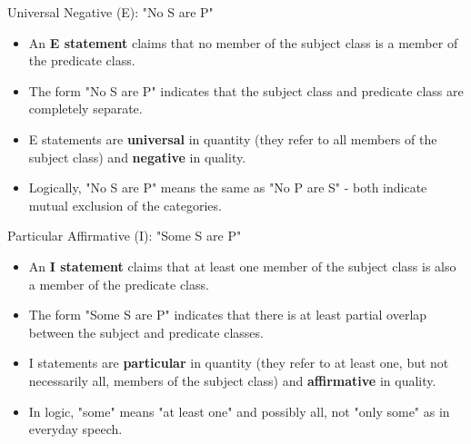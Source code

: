 \documentclass{beamer}
\begin{document}
	\begin{frame}{Universal Negative (E): "No S are P"}
		\begin{itemize}
			\item An \textbf{E statement} claims that no member of the subject class is a member of the predicate class.
			\item The form "No S are P" indicates that the subject class and predicate class are completely separate.
			\item E statements are \textbf{universal} in quantity (they refer to all members of the subject class) and \textbf{negative} in quality.
			\item Logically, "No S are P" means the same as "No P are S" - both indicate mutual exclusion of the categories.
		\end{itemize}
		
		\begin{center}
		\end{center}
	\end{frame}
	
	\begin{frame}{Particular Affirmative (I): "Some S are P"}
		\begin{itemize}
			\item An \textbf{I statement} claims that at least one member of the subject class is also a member of the predicate class.
			\item The form "Some S are P" indicates that there is at least partial overlap between the subject and predicate classes.
			\item I statements are \textbf{particular} in quantity (they refer to at least one, but not necessarily all, members of the subject class) and \textbf{affirmative} in quality.
			\item In logic, "some" means "at least one" and possibly all, not "only some" as in everyday speech.
		\end{itemize}
		
		\begin{center}
		\end{center}
	\end{frame}
	
\end{document}
